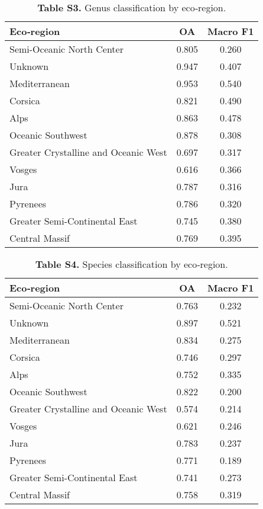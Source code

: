 \documentclass[utf8]{frontiers_suppmat}
\begin{document}
\begin{table}[H]
    \centering
    \caption{\textbf{Table S3.} Genus classification by eco‑region.}
    \begin{tabular}{lcc}
        \hline
        Eco‑region & OA & Macro F1 \\
        \hline
        Semi-Oceanic North Center & 0.805 & 0.260 \\
        Unknown & 0.947 & 0.407 \\
        Mediterranean & 0.953 & 0.540 \\
        Corsica & 0.821 & 0.490 \\
        Alps & 0.863 & 0.478 \\
        Oceanic Southwest & 0.878 & 0.308 \\
        Greater Crystalline and Oceanic West & 0.697 & 0.317 \\
        Vosges & 0.616 & 0.366 \\
        Jura & 0.787 & 0.316 \\
        Pyrenees & 0.786 & 0.320 \\
        Greater Semi-Continental East & 0.745 & 0.380 \\
        Central Massif & 0.769 & 0.395 \\
        \hline
    \end{tabular}
    \label{tab:genus_ecoregion_embeddings}
\end{table}

\begin{table}[H]
    \centering
    \caption{\textbf{Table S4.} Species classification by eco‑region.}
    \begin{tabular}{lcc}
        \hline
        Eco‑region & OA & Macro F1 \\
        \hline
        Semi-Oceanic North Center & 0.763 & 0.232 \\
        Unknown & 0.897 & 0.521 \\
        Mediterranean & 0.834 & 0.275 \\
        Corsica & 0.746 & 0.297 \\
        Alps & 0.752 & 0.335 \\
        Oceanic Southwest & 0.822 & 0.200 \\
        Greater Crystalline and Oceanic West & 0.574 & 0.214 \\
        Vosges & 0.621 & 0.246 \\
        Jura & 0.783 & 0.237 \\
        Pyrenees & 0.771 & 0.189 \\
        Greater Semi-Continental East & 0.741 & 0.273 \\
        Central Massif & 0.758 & 0.319 \\
        \hline
    \end{tabular}
    \label{tab:species_ecoregion_embeddings}
\end{table}
\end{document}
